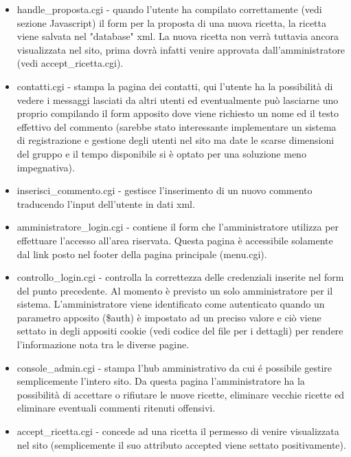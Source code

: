\documentclass[12pt]{article}
\begin{document}
\begin{itemize}
				\item handle\_proposta.cgi - quando l'utente ha compilato correttamente (vedi sezione Javascript) il form per la proposta di una nuova ricetta, la ricetta viene salvata nel "database" xml. La nuova ricetta non verr\`a tuttavia ancora visualizzata nel sito, prima dovr\`a infatti venire approvata dall'amministratore (vedi accept\_ricetta.cgi).

				\item contatti.cgi - stampa la pagina dei contatti, qui l'utente ha la possibilità di vedere i messaggi lasciati da altri utenti ed eventualmente pu\`o lasciarne uno proprio compilando il form apposito dove viene richiesto un nome ed il testo effettivo del commento (sarebbe stato interessante implementare un sistema di registrazione e gestione degli utenti nel sito ma date le scarse dimensioni del gruppo e il tempo disponibile si \`e optato per una soluzione meno impegnativa).

				\item inserisci\_commento.cgi - gestisce l'inserimento di un nuovo commento traducendo l'input dell'utente in dati xml.

				\item amministratore\_login.cgi - contiene il form che l'amministratore utilizza per effettuare l'accesso all'area riservata. Questa pagina \`e accessibile solamente dal link posto nel footer della pagina principale (menu.cgi).

				\item controllo\_login.cgi - controlla la correttezza delle credenziali inserite nel form del punto precedente. Al momento \`e previsto un solo amministratore per il sistema. L'amministratore viene identificato come autenticato quando un parametro apposito (\$auth) \`e impostato ad un preciso valore e ci\`o viene settato in degli appositi cookie (vedi codice del file per i dettagli) per rendere l'informazione nota tra le diverse pagine.

				\item console\_admin.cgi - stampa l'hub amministrativo da cui \'e possibile gestire semplicemente l'intero sito. Da questa pagina l'amministratore ha la possibilit\`a di accettare o rifiutare le nuove ricette, eliminare vecchie ricette ed eliminare eventuali commenti ritenuti offensivi.

				\item accept\_ricetta.cgi - concede ad una ricetta il permesso di venire visualizzata nel sito (semplicemente il suo attributo accepted viene settato positivamente).


\end{itemize}
\end{document}
